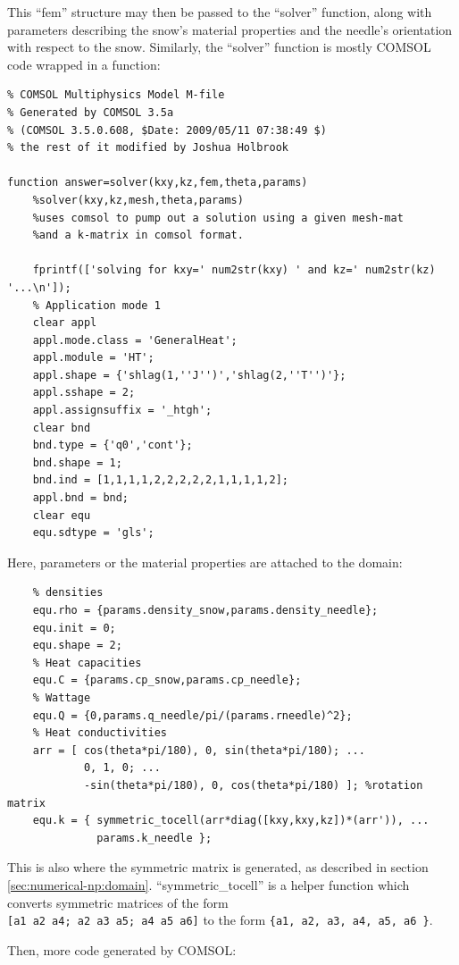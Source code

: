 This ``fem'' structure may then be passed to the ``solver'' function, along
with parameters describing the snow's material properties and the needle's
orientation with respect to the snow. Similarly, the ``solver'' function is
mostly COMSOL code wrapped in a function:

\small
\begin{verbatim}
% COMSOL Multiphysics Model M-file
% Generated by COMSOL 3.5a
% (COMSOL 3.5.0.608, $Date: 2009/05/11 07:38:49 $)
% the rest of it modified by Joshua Holbrook

function answer=solver(kxy,kz,fem,theta,params)
    %solver(kxy,kz,mesh,theta,params)
    %uses comsol to pump out a solution using a given mesh-mat 
    %and a k-matrix in comsol format.

    fprintf(['solving for kxy=' num2str(kxy) ' and kz=' num2str(kz) '...\n']);
    % Application mode 1
    clear appl
    appl.mode.class = 'GeneralHeat';
    appl.module = 'HT';
    appl.shape = {'shlag(1,''J'')','shlag(2,''T'')'};
    appl.sshape = 2;
    appl.assignsuffix = '_htgh';
    clear bnd
    bnd.type = {'q0','cont'};
    bnd.shape = 1;
    bnd.ind = [1,1,1,1,2,2,2,2,2,1,1,1,1,2];
    appl.bnd = bnd;
    clear equ
    equ.sdtype = 'gls';
\end{verbatim}
\normalsize

Here, parameters or the material properties are attached to the domain:

\small
\begin{verbatim}
    % densities
    equ.rho = {params.density_snow,params.density_needle};
    equ.init = 0;
    equ.shape = 2;
    % Heat capacities
    equ.C = {params.cp_snow,params.cp_needle};
    % Wattage
    equ.Q = {0,params.q_needle/pi/(params.rneedle)^2};
    % Heat conductivities
    arr = [ cos(theta*pi/180), 0, sin(theta*pi/180); ...
            0, 1, 0; ...
            -sin(theta*pi/180), 0, cos(theta*pi/180) ]; %rotation matrix
    equ.k = { symmetric_tocell(arr*diag([kxy,kxy,kz])*(arr')), ...
              params.k_needle };
\end{verbatim}
\normalsize

This is also where the symmetric matrix is generated, as described in section
\ref{sec:numerical-np:domain}. ``symmetric\_tocell'' is a helper function which
converts symmetric matrices of the form \\
\texttt{[a1 a2 a4; a2 a3 a5; a4 a5 a6]} to the form \texttt{\{a1, a2, a3, a4, a5, a6 \}}.

Then, more code generated by COMSOL:

